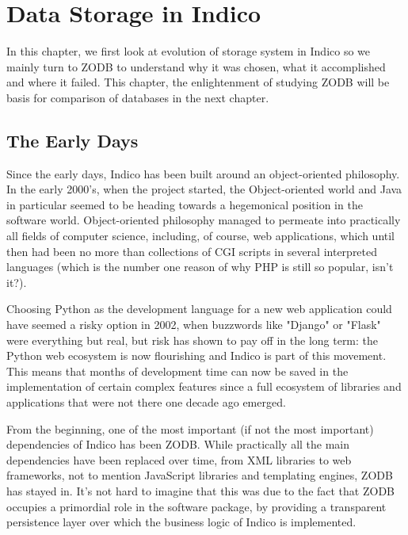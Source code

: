 
\chapter{Data Storage in Indico} %

\par In this chapter, we first look at evolution of storage system in Indico so we mainly turn to ZODB to understand why it was chosen, what it accomplished and where it failed. This chapter, the enlightenment of studying ZODB will be basis for comparison of databases in the next chapter.

\section{The Early Days}

\par Since the early days, Indico has been built around an object-oriented philosophy. In the early 2000's, when the project started, the Object-oriented world and Java in particular seemed to be heading towards a hegemonical position in the software world. Object-oriented philosophy managed to permeate into practically all fields of computer science, including, of course, web applications, which until then had been no more than collections of CGI scripts in several interpreted languages (which is the number one reason of why PHP is still so popular, isn't it?).

\par Choosing Python as the development language for a new web application could have seemed a risky option in 2002, when buzzwords like "Django" or "Flask" were everything but real, but risk has shown to pay off in the long term: the Python web ecosystem is now flourishing and Indico is part of this movement. This means that months of development time can now be saved in the implementation of certain complex features since a full ecosystem of libraries and applications that were not there one decade ago emerged.

\par From the beginning, one of the most important (if not the most important) dependencies of Indico has been ZODB. While practically all the main dependencies have been replaced over time, from XML libraries to web frameworks, not to mention JavaScript libraries and templating engines, ZODB has stayed in. It's not hard to imagine that this was due to the fact that ZODB occupies a primordial role in the software package, by providing a transparent persistence layer over which the business logic of Indico is implemented.

